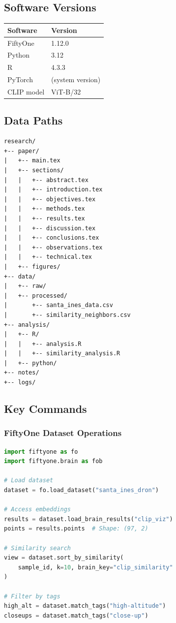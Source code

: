 
\subsection{Software Versions}

\begin{table}[H]
\centering
\begin{tabular}{ll}
\toprule
\textbf{Software} & \textbf{Version} \\
\midrule
FiftyOne & 1.12.0 \\
Python & 3.12 \\
R & 4.3.3 \\
PyTorch & (system version) \\
CLIP model & ViT-B/32 \\
\bottomrule
\end{tabular}
\end{table}

\subsection{Data Paths}

\begin{verbatim}
research/
+-- paper/
|   +-- main.tex
|   +-- sections/
|   |   +-- abstract.tex
|   |   +-- introduction.tex
|   |   +-- objectives.tex
|   |   +-- methods.tex
|   |   +-- results.tex
|   |   +-- discussion.tex
|   |   +-- conclusions.tex
|   |   +-- observations.tex
|   |   +-- technical.tex
|   +-- figures/
+-- data/
|   +-- raw/
|   +-- processed/
|       +-- santa_ines_data.csv
|       +-- similarity_neighbors.csv
+-- analysis/
|   +-- R/
|   |   +-- analysis.R
|   |   +-- similarity_analysis.R
|   +-- python/
+-- notes/
+-- logs/
\end{verbatim}

\subsection{Key Commands}

\subsubsection{FiftyOne Dataset Operations}

\begin{lstlisting}[language=Python]
import fiftyone as fo
import fiftyone.brain as fob

# Load dataset
dataset = fo.load_dataset("santa_ines_dron")

# Access embeddings
results = dataset.load_brain_results("clip_viz")
points = results.points  # Shape: (97, 2)

# Similarity search
view = dataset.sort_by_similarity(
    sample_id, k=10, brain_key="clip_similarity"
)

# Filter by tags
high_alt = dataset.match_tags("high-altitude")
closeups = dataset.match_tags("close-up")
\end{lstlisting}


